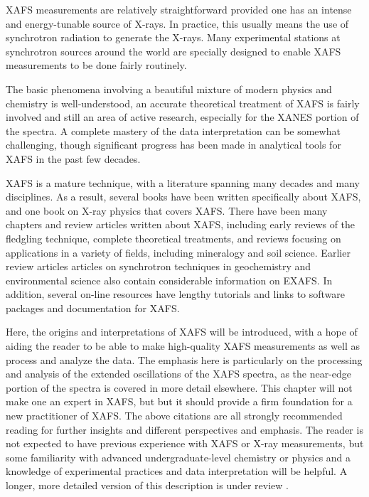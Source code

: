 XAFS measurements are relatively straightforward provided one has an
intense and energy-tunable source of X-rays.  In practice, this usually
means the use of synchrotron radiation to generate the X-rays.  Many
experimental stations at synchrotron sources around the world are specially
designed to enable XAFS measurements to be done fairly routinely.

The basic phenomena involving a beautiful mixture of modern physics and
chemistry is well-understood, an accurate theoretical treatment of XAFS is
fairly involved and still an area of active research, especially for the
XANES portion of the spectra.  A complete mastery of the data
interpretation can be somewhat challenging, though significant progress has
been made in analytical tools for XAFS in the past few decades.

XAFS is a mature technique, with a literature spanning many decades and
many disciplines.  As a result, several
books\cite{Teo1986,KoningsbergerPrins1988,GBunker2010,Calvin2013} have been
written specifically about XAFS, and one book on X-ray
physics\cite{AlsNielson2001} that covers XAFS.  There have been many
chapters and review articles written about XAFS, including early reviews of
the fledgling technique\cite{SternHeald1983}, complete theoretical
treatments\cite{RehrAlbersRMP2000}, and reviews focusing on applications in
a variety of fields, including mineralogy\cite{BrownRIMG1988} and soil
science\cite{Kelly2008}.  Earlier review articles
articles\cite{SuttonRIMG2002,ManceauRIMG2002} on synchrotron techniques in
geochemistry and environmental science also contain considerable
information on EXAFS.  In addition, several on-line
resources\cite{xafsorg,ixasportal} have lengthy tutorials and links to
software packages and documentation for XAFS.

Here,  the origins and interpretations of XAFS will be
introduced, with a hope of aiding the reader to be able to make
high-quality XAFS measurements as well as process and analyze the data.
The emphasis here is particularly on the processing and analysis of the
extended oscillations of the XAFS spectra, as the near-edge portion of the
spectra is covered in more detail elsewhere.  This chapter will not make
one an expert in XAFS, but but it should provide a firm foundation for a
new practitioner of XAFS.  The above citations are all strongly recommended
reading for further insights and different perspectives and emphasis.  The
reader is not expected to have previous experience with XAFS or X-ray
measurements, but some familiarity with advanced undergraduate-level
chemistry or physics and a knowledge of experimental practices and data
interpretation will be helpful. A longer, more detailed version of this
description is under review \cite{NewvilleRIMG2013}.

